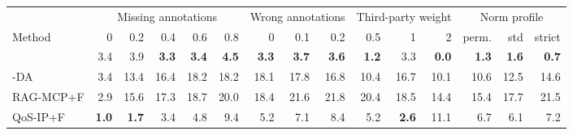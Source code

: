 \begin{tabular}{lrrrrrrrrrrrrrr}\toprule
& \multicolumn{5}{c}{Missing annotations} & \multicolumn{3}{c}{Wrong annotations} & \multicolumn{3}{c}{Third-party weight} & \multicolumn{3}{c}{Norm profile} \\ \cmidrule(lr){2-6}\cmidrule(lr){7-9}\cmidrule(lr){10-12}\cmidrule(lr){13-15}
Method & 0 & 0.2 & 0.4 & 0.6 & 0.8 & 0 & 0.1 & 0.2 & 0.5 & 1 & 2 & perm. & std & strict \\ \midrule
\sysname{} & 3.4 & 3.9 & \textbf{3.3} & \textbf{3.4} & \textbf{4.5} & \textbf{3.3} & \textbf{3.7} & \textbf{3.6} & \textbf{1.2} & 3.3 & \textbf{0.0} & \textbf{1.3} & \textbf{1.6} & \textbf{0.7} \\
\sysname{}-DA & 3.4 & 13.4 & 16.4 & 18.2 & 18.2 & 18.1 & 17.8 & 16.8 & 10.4 & 16.7 & 10.1 & 10.6 & 12.5 & 14.6 \\
RAG-MCP+F & 2.9 & 15.6 & 17.3 & 18.7 & 20.0 & 18.4 & 21.6 & 21.8 & 20.4 & 18.5 & 14.4 & 15.4 & 17.7 & 21.5 \\
QoS-IP+F & \textbf{1.0} & \textbf{1.7} & 3.4 & 4.8 & 9.4 & 5.2 & 7.1 & 8.4 & 5.2 & \textbf{2.6} & 11.1 & 6.7 & 6.1 & 7.2 \\
\bottomrule\end{tabular}

